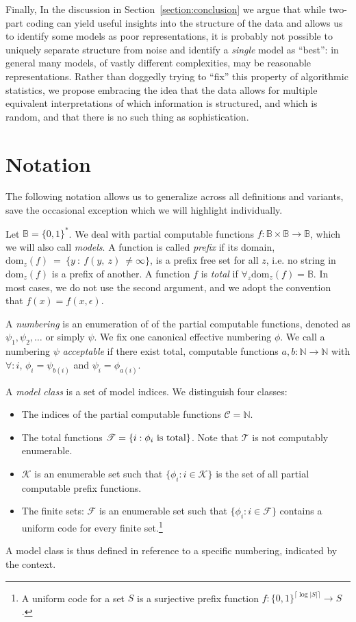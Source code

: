 \documentclass{style/llncs}
\newcommand{\C}{\mathscr C}
\newcommand{\T}{\mathscr T}
\newcommand{\F}{\mathscr F}
\newcommand{\K}{\mathscr K}
\newcommand{\B}{\mathbb B}
\newcommand{\N}{\mathbb N}
\newcommand{\tn}[1]{\textnormal{#1}}
\begin{document}
Finally, In the discussion in Section~\ref{section:conclusion} we argue that while two-part coding can yield useful insights into the structure of the data and allows us to identify some models as poor representations, it is probably not possible to uniquely separate structure from noise and identify a \emph{single} model as ``best'': in general many models, of vastly different complexities, may be reasonable representations. Rather than doggedly trying to ``fix'' this property of algorithmic statistics, we propose embracing the idea that the data allows for multiple equivalent interpretations of which information is structured, and which is random, and that there is no such thing as sophistication.

\enlargethispage{3\baselineskip} 
\section{Notation}
The following notation allows us to generalize across all definitions and variants, save the occasional exception which we will highlight individually.

Let $\B = \{0,1\}^*$. We deal with partial computable functions $f: \B \times \B \to \B$, which we will also call \emph{models}. A function is called \emph{prefix} if its domain, $\text{dom}_z(f)~=~\{y~:~f(y,~z)~\neq \infty\}$, is a prefix free set for all $z$, i.e. no string in $\text{dom}_z(f)$ is a prefix of another. A function $f$ is \emph{total} if $\forall_z \text{dom}_z(f) = \B$. In most cases, we do not use the second argument, and we adopt the convention that $f(x) = f(x, \epsilon)$.

A \emph{numbering} is an enumeration of of the partial computable functions, denoted as $\psi_1, \psi_2, \ldots$ or simply $\psi$. We fix one canonical effective numbering $\phi$. We call a numbering $\psi$ \emph{acceptable} if there exist total, computable functions $a, b: \N \to \N$ with $\forall: i$, $\phi_i = \psi_{b(i)}$ and  $\psi_i = \phi_{a(i)}$.

A \emph{model class} is a set of model indices. We distinguish four classes:
\begin{itemize} 
  \item The indices of the partial computable functions $\C=\N$.
  \item The total functions $\T=\{i:\tn{$\phi_i$ is total}\}$. Note that $\T$ is not computably enumerable.
  \item $\K$ is an enumerable set such that $\{\phi_i:i\in\K\}$ is the set of all partial computable prefix functions.
  \item The finite sets: $\F$ is an enumerable set such that $\{\phi_i:i\in\F\}$ contains a uniform code for every finite set.\footnote{A uniform code for a set $S$ is a surjective prefix function $f:\{0,1\}^{\lceil\log|S|\rceil}\to S$.}
\end{itemize}
A model class is thus defined in reference to a specific numbering, indicated by the context.
\end{document}
